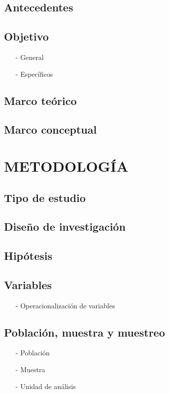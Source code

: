 \documentclass{report}
\begin{document}
\subsection{Antecedentes}
\subsection{Objetivo}
\begin{enumerate}
\item[-] General
\item[-] Específicos
\end{enumerate}
\subsection{Marco teórico}
\subsection{Marco conceptual}

\section{METODOLOGÍA}
\subsection{Tipo de estudio}
\subsection{Diseño de investigación}
\subsection{Hipótesis}
\subsection{Variables}
\begin{enumerate}
\item[-] Operacionalización de variables
\end{enumerate}
\subsection{Población, muestra y muestreo}
\begin{enumerate}
\item[-] Población
\item[-] Muestra
\item[-] Unidad de análisis
\end{enumerate}
\end{document}
